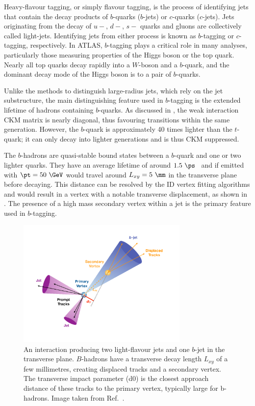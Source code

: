 Heavy-flavour tagging, or simply flavour tagging, is the process of identifying jets that contain the decay products of $b$-quarks ($b$-jets) or  $c$-quarks ($c$-jets).
Jets originating from the decay of $u-$, $d-$, $s-$ quarks and gluons are collectively called light-jets.
Identifying jets from either process is known as $b$-tagging or $c$-tagging, respectively.
In ATLAS, $b$-tagging plays a critical role in many analyses, particularly those measuring properties of the Higgs boson or the top quark.
Nearly all top quarks decay rapidly into a $W$-boson and a $b$-quark, and the dominant decay mode of the Higgs boson is to a pair of $b$-quarks.

Unlike the methods to distinguish large-radius jets, which rely on the jet substructure, the main distinguishing feature used in $b$-tagging is the extended lifetime of hadrons containing $b$-quarks.
As discussed in , the weak interaction CKM matrix is nearly diagonal, thus favouring transitions within the same generation.
However, the $b$-quark is approximately 40 times lighter than the $t$-quark; it can only decay into lighter generations and is thus CKM suppressed.

The $b$-hadrons are quasi-stable bound states between a $b$-quark and one or two lighter quarks.
They have an average lifetime of around $1.5~\ps$~\cite{ParticleDataGroup} and if emitted with $\pt=50~\GeV$ would travel around $L_{xy} = 5~\mm$ in the transverse plane before decaying.
This distance can be resolved by the ID vertex fitting algorithms and would result in a vertex with a notable transverse displacement, as shown in .
The presence of a high mass secondary vertex within a jet is the primary feature used in $b$-tagging.

\begin{figure}[htb]
    \centering
    \includegraphics[width=0.75\textwidth]{Figures/cern_atlas/bjet.png}
    \caption{An interaction producing two light-flavour jets and one $b$-jet in the transverse plane. $B$-hadrons have a transverse decay length $L_{xy}$ of a few millimetres, creating displaced tracks and a secondary vertex. The transverse impact parameter (d0) is the closest approach distance of these tracks to the primary vertex, typically large for b-hadrons. Image taken from Ref.~\cite{BJetImage}.}
    \label{fig:btagging}
\end{figure}

